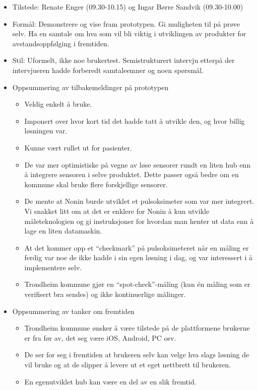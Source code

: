 \begin{itemize}
\tightlist
\item
  Tilstede: Renate Enger (09.30-10.15) og Ingar Børre Sandvik
  (09.30-10.00)
\item
  Formål: Demonstrere og vise fram prototypen. Gi muligheten til på
  prøve selv. Ha en samtale om hva som vil bli viktig i utviklingen av
  produkter for avstandsoppfølging i fremtiden.
\item
  Stil: Uformelt, ikke noe brukertest. Semistrukturert intervju etterpå
  der intervjueren hadde forberedt samtaleemner og noen spørsmål.
\item
  Oppsummering av tilbakemeldinger på prototypen

  \begin{itemize}
  \tightlist
  \item
    Veldig enkelt å bruke.
  \item
    Imponert over hvor kort tid det hadde tatt å utvikle den, og hvor
    billig løsningen var.
  \item
    Kunne vært rullet ut for pasienter.
  \item
    De var mer optimistiske på vegne av løse sensorer rundt en liten hub
    enn å integrere sensoren i selve produktet. Dette passer også bedre
    om en kommune skal bruke flere forskjellige sensorer.
  \item
    De mente at Nonin burde utviklet et pulsoksimeter som var mer
    integrert. Vi snakket litt om at det er enklere for Nonin å kun
    utvikle måleteknologien og gi instruksjoner for hvordan man henter
    ut data enn å lage en liten datamaskin.
  \item
    At det kommer opp et ``checkmark'' på pulsoksimeteret når en måling
    er ferdig var noe de ikke hadde i sin egen løsning i dag, og var
    interessert i å implementere selv.
  \item
    Trondheim kommune gjør en ``spot-check''-måling (kun én måling som
    er verifisert bra sendes) og ikke kontinuerlige målinger.
  \end{itemize}
\item
  Oppsummering av tanker om fremtiden

  \begin{itemize}
  \tightlist
  \item
    Trondheim kommune ønsker å være tilstede på de plattformene brukerne
    er fra før av, det seg være iOS, Android, PC osv.
  \item
    De ser for seg i fremtiden at brukeren selv kan velge hva slags
    løsning de vil bruke og at de slipper å levere ut et eget nettbrett
    til brukeren.
  \item
    En egenutviklet hub kan være en del av en slik fremtid.
  \end{itemize}
\end{itemize}

